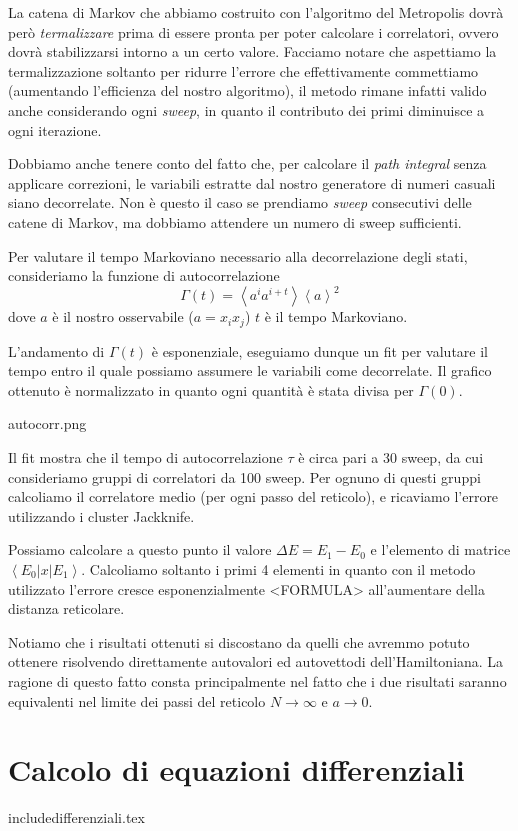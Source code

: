 \documentclass[a4paper,10pt]{article}
\begin{document}
La catena di Markov che abbiamo costruito con l'algoritmo del Metropolis dovrà però \emph{termalizzare} prima di essere pronta per poter calcolare i correlatori, ovvero dovrà stabilizzarsi intorno a un certo valore. Facciamo notare che aspettiamo la termalizzazione soltanto per ridurre l'errore che effettivamente commettiamo (aumentando l'efficienza del nostro algoritmo), il metodo rimane infatti valido anche considerando ogni \emph{sweep}, in quanto il contributo dei primi diminuisce a ogni iterazione.

Dobbiamo anche tenere conto del fatto che, per calcolare il \emph{path integral} senza applicare correzioni, le variabili estratte dal nostro generatore di numeri casuali siano decorrelate. Non è questo il caso se prendiamo \emph{sweep} consecutivi delle catene di Markov, ma dobbiamo attendere un numero di sweep sufficienti.

Per valutare il tempo Markoviano necessario alla decorrelazione degli stati, consideriamo la funzione di autocorrelazione
$$\Gamma(t) = \left<a^ia^{i+t}\right>\left<a\right>^2$$
dove $a$ è il nostro osservabile ($a=x_ix_j$) $t$ è il tempo Markoviano.

L'andamento di $\Gamma(t)$ è esponenziale, eseguiamo dunque un fit per valutare il tempo entro il quale possiamo assumere le variabili come decorrelate. Il grafico ottenuto è normalizzato in quanto ogni quantità è stata divisa per $\Gamma(0)$.

autocorr.png

Il fit mostra che il tempo di autocorrelazione $\tau$ è circa pari a 30 sweep, da cui consideriamo gruppi di correlatori da 100 sweep. Per ognuno di questi gruppi calcoliamo il correlatore medio (per ogni passo del reticolo), e ricaviamo l'errore utilizzando i cluster Jackknife.

Possiamo calcolare a questo punto il valore $\Delta E=E_1-E_0$ e l'elemento di matrice $\left<E_0|x|E_1\right>$. Calcoliamo soltanto i primi 4 elementi in quanto con il metodo utilizzato l'errore cresce esponenzialmente <FORMULA> all'aumentare della distanza reticolare.

Notiamo che i risultati ottenuti si discostano da quelli che avremmo potuto ottenere risolvendo direttamente autovalori ed autovettodi dell'Hamiltoniana. La ragione di questo fatto consta principalmente nel fatto che i due risultati saranno equivalenti nel limite dei passi del reticolo $N\to\infty$ e $a\to0$.

\section{Calcolo di equazioni differenziali}

include{differenziali.tex}
\end{document}
